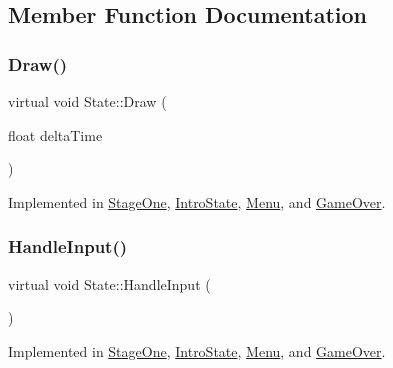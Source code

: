 \subsection{Member Function Documentation}
\mbox{\label{classState_ae3bc988c6103665bca68560742fb40e1}} 
\subsubsection{\texorpdfstring{Draw()}{Draw()}}
{\footnotesize\ttfamily virtual void State\+::\+Draw (\begin{DoxyParamCaption}\item[{float}]{delta\+Time }\end{DoxyParamCaption})\hspace{0.3cm}{\ttfamily [pure virtual]}}



Implemented in \mbox{\hyperlink{classStageOne_af59dff5e563f4d1f45ea4b8708a3301e}{Stage\+One}}, \mbox{\hyperlink{classIntroState_a903b8e2b781eae1e9a6e7db08d38fd2c}{Intro\+State}}, \mbox{\hyperlink{classMenu_a510885af1fe41d02c1669fca278f7eed}{Menu}}, and \mbox{\hyperlink{classGameOver_a263a49026ce81b22721cfc515f8efd4e}{Game\+Over}}.

\mbox{\label{classState_ad3de659bdeb45c97486464461d625e8f}} 
\subsubsection{\texorpdfstring{Handle\+Input()}{HandleInput()}}
{\footnotesize\ttfamily virtual void State\+::\+Handle\+Input (\begin{DoxyParamCaption}{ }\end{DoxyParamCaption})\hspace{0.3cm}{\ttfamily [pure virtual]}}



Implemented in \mbox{\hyperlink{classStageOne_a168fa7a88a44900ab5d91bfe87150221}{Stage\+One}}, \mbox{\hyperlink{classIntroState_a6a2a89b3374f53e1bcf366c0ae896109}{Intro\+State}}, \mbox{\hyperlink{classMenu_a0cb3596524ed7fd021f999860b563bf8}{Menu}}, and \mbox{\hyperlink{classGameOver_a1b90d0ed04386fe166cbfcf2427a5175}{Game\+Over}}.

\mbox{\label{classState_a7ab4d8c6aa239a17ed579d89a209b156}} 
